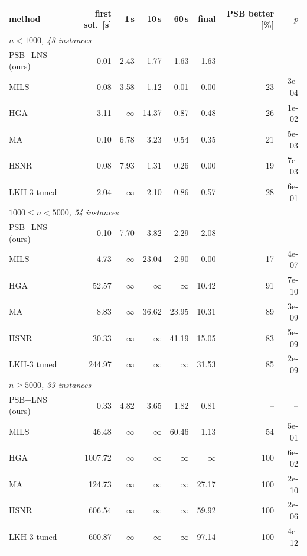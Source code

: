 \begin{tabular}{lrrrrrrr}
\toprule
method & first sol.\ [s] & 1\,s & 10\,s & 60\,s & final & PSB better [\%] & $p$ \\
\midrule
\multicolumn{8}{l}{\emph{$n<1000$, 43 instances}} \\
PSB+LNS (ours) & 0.01 & 2.43 & 1.77 & 1.63 & 1.63 & -- & -- \\
MILS & 0.08 & 3.58 & 1.12 & 0.01 & 0.00 & 23 & 3e-04 \\
HGA & 3.11 & \ensuremath{\infty} & 14.37 & 0.87 & 0.48 & 26 & 1e-02 \\
MA & 0.10 & 6.78 & 3.23 & 0.54 & 0.35 & 21 & 5e-03 \\
HSNR & 0.08 & 7.93 & 1.31 & 0.26 & 0.00 & 19 & 7e-03 \\
LKH-3 tuned & 2.04 & \ensuremath{\infty} & 2.10 & 0.86 & 0.57 & 28 & 6e-01 \\
\midrule
\multicolumn{8}{l}{\emph{$1000\le n<5000$, 54 instances}} \\
PSB+LNS (ours) & 0.10 & 7.70 & 3.82 & 2.29 & 2.08 & -- & -- \\
MILS & 4.73 & \ensuremath{\infty} & 23.04 & 2.90 & 0.00 & 17 & 4e-07 \\
HGA & 52.57 & \ensuremath{\infty} & \ensuremath{\infty} & \ensuremath{\infty} & 10.42 & 91 & 7e-10 \\
MA & 8.83 & \ensuremath{\infty} & 36.62 & 23.95 & 10.31 & 89 & 3e-09 \\
HSNR & 30.33 & \ensuremath{\infty} & \ensuremath{\infty} & 41.19 & 15.05 & 83 & 5e-09 \\
LKH-3 tuned & 244.97 & \ensuremath{\infty} & \ensuremath{\infty} & \ensuremath{\infty} & 31.53 & 85 & 2e-09 \\
\midrule
\multicolumn{8}{l}{\emph{$n\ge 5000$, 39 instances}} \\
PSB+LNS (ours) & 0.33 & 4.82 & 3.65 & 1.82 & 0.81 & -- & -- \\
MILS & 46.48 & \ensuremath{\infty} & \ensuremath{\infty} & 60.46 & 1.13 & 54 & 5e-01 \\
HGA & 1007.72 & \ensuremath{\infty} & \ensuremath{\infty} & \ensuremath{\infty} & \ensuremath{\infty} & 100 & 6e-02 \\
MA & 124.73 & \ensuremath{\infty} & \ensuremath{\infty} & \ensuremath{\infty} & 27.17 & 100 & 2e-10 \\
HSNR & 606.54 & \ensuremath{\infty} & \ensuremath{\infty} & \ensuremath{\infty} & 59.92 & 100 & 2e-06 \\
LKH-3 tuned & 600.87 & \ensuremath{\infty} & \ensuremath{\infty} & \ensuremath{\infty} & 97.14 & 100 & 4e-12 \\
\bottomrule
\end{tabular}

